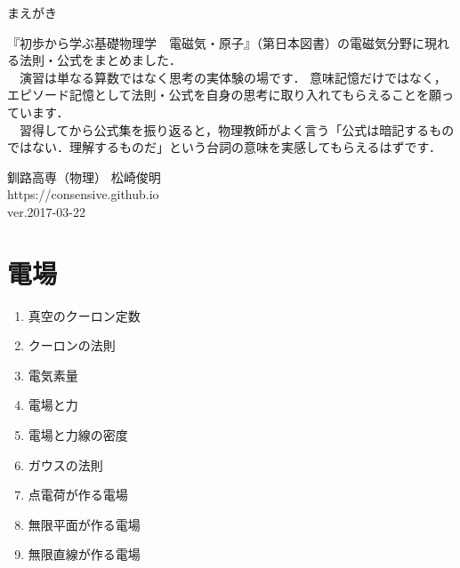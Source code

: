 \documentclass[10pt]{jarticle}
\begin{document}
\addtocounter{page}{-1}
\thispagestyle{empty}

まえがき\\

{\scriptsize
『初歩から学ぶ基礎物理学　電磁気・原子』（第日本図書）の電磁気分野に現れる法則・公式をまとめました．\\

　演習は単なる算数ではなく思考の実体験の場です．
意味記憶だけではなく，エピソード記憶として法則・公式を自身の思考に取り入れてもらえることを願っています．\\

　習得してから公式集を振り返ると，物理教師がよく言う「公式は暗記するものではない．理解するものだ」という台詞の意味を実感してもらえるはずです．




\vfill
\hfill 釧路高専（物理） 松崎俊明\\
\hfill https://consensive.github.io\\

\vskip-3mm \hfill ver.2017-03-22\\
}



\addtocounter{page}{-1}
\thispagestyle{empty}
\tableofcontents



\newpage
\addtocounter{page}{-1}
\thispagestyle{empty}
\section{電場}

\begin{enumerate}
\small
\itemsep-4mm
\item 真空のクーロン定数 \\
\item クーロンの法則 \\
\item 電気素量 \\
\item 電場と力 \\
\item 電場と力線の密度 \\
\item ガウスの法則 \\
\item 点電荷が作る電場 \\
\item 無限平面が作る電場 \\
\item 無限直線が作る電場 \\
\end{enumerate}
\end{document}
